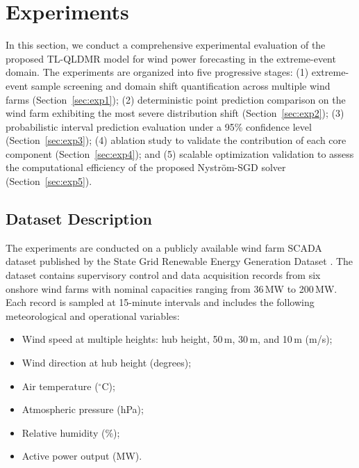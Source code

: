 \section{Experiments}\label{Experiments}

In this section, we conduct a comprehensive experimental evaluation of the proposed TL-QLDMR model for wind power forecasting in the extreme-event domain. The experiments are organized into five progressive stages: (1) extreme-event sample screening and domain shift quantification across multiple wind farms (Section~\ref{sec:exp1}); (2) deterministic point prediction comparison on the wind farm exhibiting the most severe distribution shift (Section~\ref{sec:exp2}); (3) probabilistic interval prediction evaluation under a 95\% confidence level (Section~\ref{sec:exp3}); (4) ablation study to validate the contribution of each core component (Section~\ref{sec:exp4}); and (5) scalable optimization validation to assess the computational efficiency of the proposed Nystr\"{o}m-SGD solver (Section~\ref{sec:exp5}). 

\subsection{Dataset Description}\label{sec:data}

The experiments are conducted on a publicly available wind farm SCADA dataset published by the State Grid Renewable Energy Generation Dataset \citep{s41597-022-01696-6}. The dataset contains supervisory control and data acquisition records from six onshore wind farms with nominal capacities ranging from 36\,MW to 200\,MW. Each record is sampled at 15-minute intervals and includes the following meteorological and operational variables:

\begin{itemize}
    \item Wind speed at multiple heights: hub height, 50\,m, 30\,m, and 10\,m (m/s);
    \item Wind direction at hub height (degrees);
    \item Air temperature ($^\circ$C);
    \item Atmospheric pressure (hPa);
    \item Relative humidity (\%);
    \item Active power output (MW).
\end{itemize}

